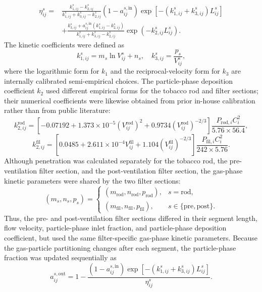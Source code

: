 \documentclass[11pt]{article}
\begin{document}
\[
\begin{aligned}
\eta_{ij}^{s}={}&
\frac{k_{1,ij}^{s}-k_{2,ij}^{s}}{k_{1,ij}^{s}+k_{3,ij}^{s}-k_{2,ij}^{s}}
\left(1-a_{ij}^{s,\mathrm{in}}\right)
\exp\left[-\left(k_{1,ij}^{s}+k_{3,ij}^{s}\right)L_{ij}^{s}\right] \\
&+
\frac{k_{3,ij}^{s}+a_{ij}^{s,\mathrm{in}}\left(k_{1,ij}^{s}-k_{2,ij}^{s}\right)}
{k_{1,ij}^{s}+k_{3,ij}^{s}-k_{2,ij}^{s}}
\exp\left(-k_{2,ij}^{s}L_{ij}^{s}\right).
\end{aligned}
\]
The kinetic coefficients were defined as
\[
k_{1,ij}^{s}=m_s\ln V_{ij}^{s}+n_s,
\quad
k_{3,ij}^{s}=\frac{p_s}{V_{ij}^{s}},
\]
where the logarithmic form for $k_1$ and the reciprocal-velocity form for $k_3$ are internally calibrated semi-empirical choices. The particle-phase deposition coefficient $k_2$ used different empirical forms for the tobacco rod and filter sections; their numerical coefficients were likewise obtained from prior in-house calibration rather than from public literature:
\[
k_{2,ij}^{\mathrm{rod}}=
\left[-0.07192+1.373\times10^{-5}\left(V_{ij}^{\mathrm{rod}}\right)^2
+0.9734\left(V_{ij}^{\mathrm{rod}}\right)^{-2/3}\right]
\frac{P_{\mathrm{rod},i}C_i^2}{5.76\times56.4},
\]
\[
k_{2,ij}^{\mathrm{fil}}=
\left[0.0485+2.611\times10^{-4}V_{ij}^{\mathrm{fil}}
+1.104\left(V_{ij}^{\mathrm{fil}}\right)^{-2/3}\right]
\frac{P_{\mathrm{fil},i}C_i^2}{242\times5.76}.
\]
Although penetration was calculated separately for the tobacco rod, the pre-ventilation filter section, and the post-ventilation filter section, the gas-phase kinetic parameters were shared by the two filter sections:
\[
(m_s,n_s,p_s)=
\begin{cases}
(m_{\mathrm{rod}},n_{\mathrm{rod}},p_{\mathrm{rod}}), & s=\mathrm{rod},\\
(m_{\mathrm{fil}},n_{\mathrm{fil}},p_{\mathrm{fil}}), & s\in\{\mathrm{pre},\mathrm{post}\}.
\end{cases}
\]
Thus, the pre- and post-ventilation filter sections differed in their segment length, flow velocity, particle-phase inlet fraction, and particle-phase deposition coefficient, but used the same filter-specific gas-phase kinetic parameters.
Because the gas-particle partitioning changes after each segment, the particle-phase fraction was updated sequentially as
\[
a_{ij}^{s,\mathrm{out}}=
1-\frac{\left(1-a_{ij}^{s,\mathrm{in}}\right)
\exp\left[-\left(k_{1,ij}^{s}+k_{3,ij}^{s}\right)L_{ij}^{s}\right]}
{\eta_{ij}^{s}}.
\]
\end{document}
